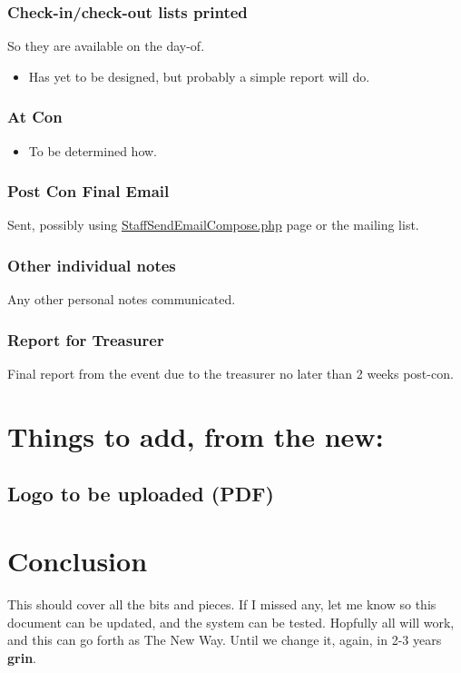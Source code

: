 \documentclass[captions=tablesignature]{scrartcl}
\begin{document}
\subsubsection{Check-in/check-out lists printed}
\label{sec-3-2-22}
So they are available on the day-of.
\begin{itemize}
\item Has yet to be designed, but probably a simple report will do.
\end{itemize}

\subsubsection{At Con}
\label{sec-3-2-23}
\begin{itemize}
\item To be determined how.
\end{itemize}

\subsubsection{Post Con Final Email}
\label{sec-3-2-24}
Sent, possibly using \href{../webpages/StaffSendEmailCompose.php}{StaffSendEmailCompose.php} page or
the mailing list.

\subsubsection{Other individual notes}
\label{sec-3-2-25}
Any other personal notes communicated.

\subsubsection{Report for Treasurer}
\label{sec-3-2-26}
Final report from the event due to the treasurer no later than 2
weeks post-con.

\section{Things to add, from the new:}
\label{sec-4}
\subsection{Logo to be uploaded (PDF)}
\label{sec-4-1}

\section{Conclusion}
\label{sec-5}
This should cover all the bits and pieces.  If I missed any, let me
know so this document can be updated, and the system can be tested.
Hopfully all will work, and this can go forth as The New Way.  Until
we change it, again, in 2-3 years \textbf{grin}.
\end{document}

